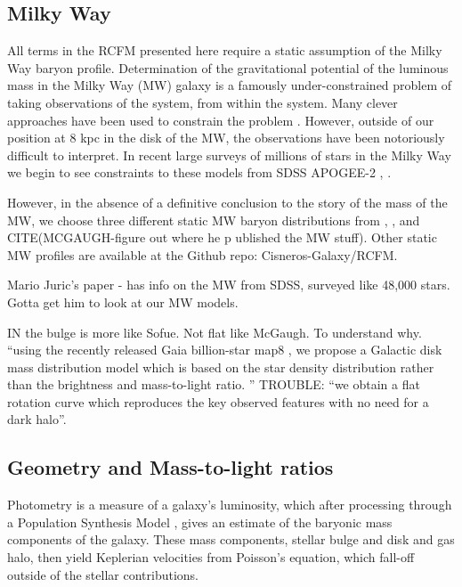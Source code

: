 \documentclass[reprint,%
 amsmath,amssymb,
 aps,
]{revtex4-1}
\begin{document}
\subsection{Milky Way}
 
All terms in the RCFM presented here require a static assumption of the Milky Way  baryon profile. 
Determination of the gravitational potential of the luminous mass in the Milky Way (MW) galaxy is a famously under-constrained problem of   taking observations of the system, from within the system. Many clever approaches have been used to constrain the    problem \cite{1991ARA&A..29..409F}.
However, outside of our position at 8 kpc in the disk of the MW, the observations have been notoriously difficult to interpret. In  recent large surveys of millions of  stars in the Milky Way  we begin to see  constraints to these models from  SDSS APOGEE-2 \cite{2022ApJS..259...35A},  \cite{10.1093/mnras/stt814}.  

However, in the absence of a definitive conclusion to the story of the mass of the MW, we choose three different static MW baryon distributions from \cite{Xue}, \cite{Sofue}, and CITE(MCGAUGH-figure out where he p ublished the MW stuff). 
Other static MW profiles are available at the Github repo: Cisneros-Galaxy/RCFM. 

\cite{2008ApJ...673..864J} Mario Juric's paper - has info  on the MW from SDSS, surveyed like 48,000 stars. Gotta get him to look at our MW models. 


 

IN \cite{Li2016ModellingMD} the bulge is more like Sofue. Not flat like McGaugh. 
To understand why. 
``using the recently released Gaia billion-star map8
, we propose a
Galactic disk mass distribution model which is based on the star density distribution
rather than the brightness and mass-to-light ratio. ''
TROUBLE: ``we obtain a flat rotation curve
which reproduces the key observed features with no need for a dark halo''.

  
\subsection{Geometry and Mass-to-light ratios}
Photometry 
 is a measure of   a  galaxy's luminosity, which   after processing   through a Population Synthesis Model \cite{BelldYong,10.1093/mnras/sty3223}, gives an estimate of the  baryonic mass components of the galaxy. These mass components, stellar bulge and disk and gas halo, then     yield   Keplerian velocities 
   from Poisson's equation, which fall-off outside of the stellar contributions. 
   
\end{document}
